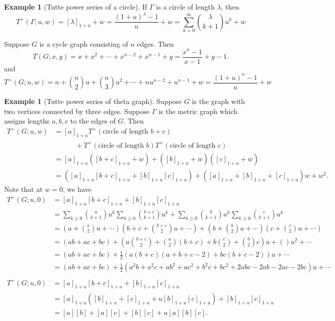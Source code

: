 \documentclass{amsart}
\theoremstyle{definition}
\newtheorem{eg}[thm]{Example}
\begin{document}
\begin{eg}[Tutte power series of a circle]
If $\Gamma$ is a circle of length $\lambda$, then 
$$
T^+(\Gamma;u,w) = [\lambda]_{1+u}  + w =  \frac{(1 + u)^\lambda - 1}{u} + w
= \sum_{k=0}^\infty \binom{\lambda}{k+1} u^{k} + w
$$

Suppose $G$ is a cycle graph consisting of $n$ edges.
Then
$$
T(G;x,y) = x + x^2 + \cdots + x^{n-2} + x^{n-1} + y 
= \frac{x^n - 1}{x - 1} + y - 1.
$$
and
$$
T^+(G;u,w) = n + \binom{n}{2}u + \binom{n}{3} u^2 + \cdots + nu^{n-2} + u^{n-1} + w
= \frac{(1+u)^n-1}{u} + w
$$
\end{eg}

\begin{eg}[Tutte power series of theta graph]
Suppose $G$ is the graph with two vertices connected by three edges.
Suppose $\Gamma$ is the metric graph which assigns lengths $a,b,c$ to the edges of $G$.
Then
\begin{align*}
T^+(G;u,w) &= [a]_{1+u} T^+(\text{circle of length }b+c) \\
&\qquad\quad + T^+(\text{circle of length }b)T^+(\text{circle of length }c) \\
&= [a]_{1+u} ([b+c]_{1+u} + w)
+ ([b]_{1+u} + w) ([c]_{1+u} + w) \\
&= ([a]_{1+u} [b+c]_{1+u} + [b]_{1+u}[c]_{1+u} ) + 
([a]_{1+u} + [b]_{1+u} + [c]_{1+u}) w + w^2 .
\end{align*}
Note that at $w = 0$, we have
\begin{align*}
T^+(G;u,0) &= [a]_{1+u} [b+c]_{1+u} + [b]_{1+u}[c]_{1+u} \\
&= \sum_{k\geq 0}\binom{a}{k+1}u^k \sum_{k\geq 0} \binom{b+c}{k+1}u^k + \sum_{k\geq 0}\binom{b}{k+1}u^k \sum_{k\geq 0}\binom{c}{k+1}u^k \\
&= \left( a + \binom{a}{2}u + \cdots\right) \left(b + c + \binom{b+c}{2} u + \cdots\right) + \left(b + \binom{b}{2}u + \cdots\right) \left(c + \binom{c}{2}u + \cdots\right) \\
&= (ab + ac + bc) + \left(a\binom{b+c}{2} + \binom{a}{2}(b+c) + b\binom{c}{2} + \binom{b}{2} c \right)u + () u^2 + \cdots  \\
&= (ab + ac + bc) + \frac12 \left(a(b+c)(a+b+c-2) + bc(b+c-2) \right)u + \cdots \\
&= (ab + ac + bc) + \frac12 \left(a^2b + a^2c +ab^2 +ac^2 + b^2c + bc^2 + 2abc-2ab - 2ac - 2bc \right)u + \cdots \\
\end{align*}
\begin{align*}
T^+(G;u,0) &= [a]_{1+u} [b+c]_{1+u} + [b]_{1+u}[c]_{1+u} \\
&= [a]_{1+u} \left([b]_{1+u} + [c]_{1+u} + u[b]_{1+u} [c]_{1+u} \right) + [b]_{1+u} [c]_{1+u} \\
&= [a][b] + [a][c] + [b][c] + u[a][b][c] .
\end{align*}

\end{eg}
\end{document}

